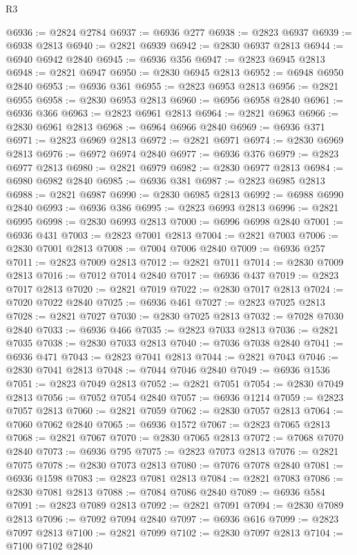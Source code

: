 \begin{lexlean}{R3}
\begin{coremodule}
@6936 := @2824 @2784
@6937 := @6936 @277
@6938 := @2823 @6937
@6939 := @6938 @2813
@6940 := @2821 @6939
@6942 := @2830 @6937 @2813
@6944 := @6940 @6942 @2840
@6945 := @6936 @356
@6947 := @2823 @6945 @2813
@6948 := @2821 @6947
@6950 := @2830 @6945 @2813
@6952 := @6948 @6950 @2840
@6953 := @6936 @361
@6955 := @2823 @6953 @2813
@6956 := @2821 @6955
@6958 := @2830 @6953 @2813
@6960 := @6956 @6958 @2840
@6961 := @6936 @366
@6963 := @2823 @6961 @2813
@6964 := @2821 @6963
@6966 := @2830 @6961 @2813
@6968 := @6964 @6966 @2840
@6969 := @6936 @371
@6971 := @2823 @6969 @2813
@6972 := @2821 @6971
@6974 := @2830 @6969 @2813
@6976 := @6972 @6974 @2840
@6977 := @6936 @376
@6979 := @2823 @6977 @2813
@6980 := @2821 @6979
@6982 := @2830 @6977 @2813
@6984 := @6980 @6982 @2840
@6985 := @6936 @381
@6987 := @2823 @6985 @2813
@6988 := @2821 @6987
@6990 := @2830 @6985 @2813
@6992 := @6988 @6990 @2840
@6993 := @6936 @386
@6995 := @2823 @6993 @2813
@6996 := @2821 @6995
@6998 := @2830 @6993 @2813
@7000 := @6996 @6998 @2840
@7001 := @6936 @431
@7003 := @2823 @7001 @2813
@7004 := @2821 @7003
@7006 := @2830 @7001 @2813
@7008 := @7004 @7006 @2840
@7009 := @6936 @257
@7011 := @2823 @7009 @2813
@7012 := @2821 @7011
@7014 := @2830 @7009 @2813
@7016 := @7012 @7014 @2840
@7017 := @6936 @437
@7019 := @2823 @7017 @2813
@7020 := @2821 @7019
@7022 := @2830 @7017 @2813
@7024 := @7020 @7022 @2840
@7025 := @6936 @461
@7027 := @2823 @7025 @2813
@7028 := @2821 @7027
@7030 := @2830 @7025 @2813
@7032 := @7028 @7030 @2840
@7033 := @6936 @466
@7035 := @2823 @7033 @2813
@7036 := @2821 @7035
@7038 := @2830 @7033 @2813
@7040 := @7036 @7038 @2840
@7041 := @6936 @471
@7043 := @2823 @7041 @2813
@7044 := @2821 @7043
@7046 := @2830 @7041 @2813
@7048 := @7044 @7046 @2840
@7049 := @6936 @1536
@7051 := @2823 @7049 @2813
@7052 := @2821 @7051
@7054 := @2830 @7049 @2813
@7056 := @7052 @7054 @2840
@7057 := @6936 @1214
@7059 := @2823 @7057 @2813
@7060 := @2821 @7059
@7062 := @2830 @7057 @2813
@7064 := @7060 @7062 @2840
@7065 := @6936 @1572
@7067 := @2823 @7065 @2813
@7068 := @2821 @7067
@7070 := @2830 @7065 @2813
@7072 := @7068 @7070 @2840
@7073 := @6936 @795
@7075 := @2823 @7073 @2813
@7076 := @2821 @7075
@7078 := @2830 @7073 @2813
@7080 := @7076 @7078 @2840
@7081 := @6936 @1598
@7083 := @2823 @7081 @2813
@7084 := @2821 @7083
@7086 := @2830 @7081 @2813
@7088 := @7084 @7086 @2840
@7089 := @6936 @584
@7091 := @2823 @7089 @2813
@7092 := @2821 @7091
@7094 := @2830 @7089 @2813
@7096 := @7092 @7094 @2840
@7097 := @6936 @616
@7099 := @2823 @7097 @2813
@7100 := @2821 @7099
@7102 := @2830 @7097 @2813
@7104 := @7100 @7102 @2840

\end{coremodule}
\end{lexlean}
